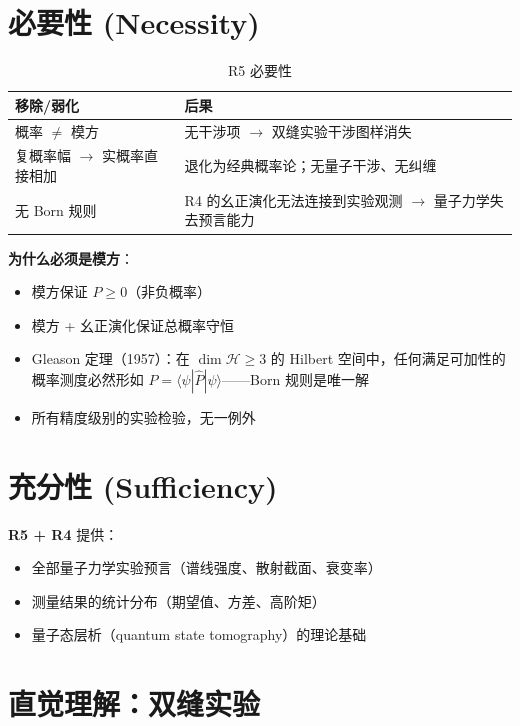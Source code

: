 \section{必要性 (Necessity)}

\begin{table}[h]
\centering
\small
\begin{tabular}{p{4cm}p{7cm}}
\toprule
\textbf{移除/弱化} & \textbf{后果} \\
\midrule
概率 $\neq$ 模方 & 无干涉项 $\to$ 双缝实验干涉图样消失 \\
复概率幅 $\to$ 实概率直接相加 & 退化为经典概率论；无量子干涉、无纠缠 \\
无 Born 规则 & R4 的幺正演化无法连接到实验观测 $\to$ 量子力学失去预言能力 \\
\bottomrule
\end{tabular}
\caption{R5 必要性}
\end{table}

\textbf{为什么必须是模方}：
\begin{itemize}
  \item 模方保证 $P \ge 0$（非负概率）
  \item 模方 + 幺正演化保证总概率守恒
  \item Gleason 定理（1957）：在 $\dim\mathcal{H} \ge 3$ 的 Hilbert 空间中，任何满足可加性的概率测度必然形如 $P = \langle\psi|\hat{P}|\psi\rangle$——Born 规则是唯一解
  \item 所有精度级别的实验检验，无一例外
\end{itemize}

\section{充分性 (Sufficiency)}

\textbf{R5 + R4} 提供：
\begin{itemize}
  \item 全部量子力学实验预言（谱线强度、散射截面、衰变率）
  \item 测量结果的统计分布（期望值、方差、高阶矩）
  \item 量子态层析（quantum state tomography）的理论基础
\end{itemize}

\section{直觉理解：双缝实验}

